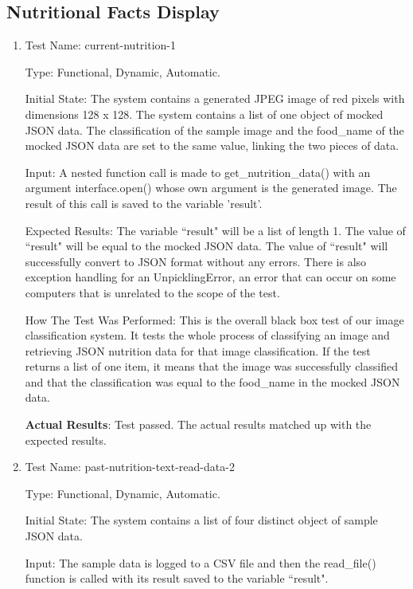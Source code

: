 \documentclass[12pt, titlepage]{article}
\begin{document}
	\subsection{Nutritional Facts Display}
	\begin{enumerate}
		
        \item{Test Name: current-nutrition-1}
        
        Type: Functional, Dynamic, Automatic.
		
		Initial State: The system contains a generated JPEG image of red pixels with dimensions 128 x 128. The system contains a list of one object of mocked JSON data. The classification of the sample image and the food\_name of the mocked JSON data are set to the same value, linking the two pieces of data.
		
		Input: A nested function call is made to get\_nutrition\_data() with an argument interface.open() whose own argument is the generated image. The result of this call is saved to the variable 'result'.
		
		Expected Results: The variable ``result" will be a list of length 1. The value of ``result" will be equal to the mocked JSON data. The value of ``result" will successfully convert to JSON format without any errors. There is also exception handling for an UnpicklingError, an error that can occur on some computers that is unrelated to the scope of the test.
		
		How The Test Was Performed: This is the overall black box test of our image classification system. It tests the whole process of classifying an image and retrieving JSON nutrition data for that image classification. If the test returns a list of one item, it means that the image was successfully classified and that the classification was equal to the food\_name in the mocked JSON data.
		
		\textbf{Actual Results}: Test passed. The actual results matched up with the expected results.
		
		\item{Test Name: past-nutrition-text-read-data-2}
		
		Type: Functional, Dynamic, Automatic.
		
		Initial State: The system contains a list of four distinct object of sample JSON data.
		
		Input: The sample data is logged to a CSV file and then the read\_file() function is called with its result saved to the variable ``result".
		

\end{enumerate}
\end{document}
